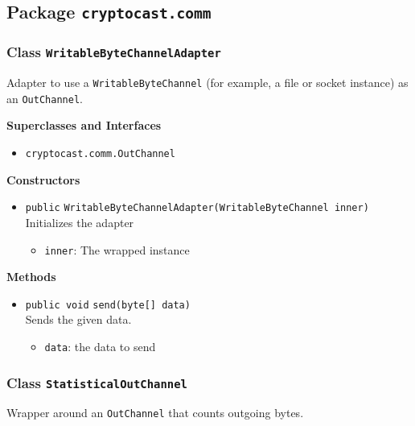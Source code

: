 \subsection{Package \lstinline!cryptocast.comm!}

\subsubsection{Class \lstinline|WritableByteChannelAdapter|}
Adapter to use a \lstinline|WritableByteChannel| (for example, a file or socket instance) as
 an \lstinline|OutChannel|. \\



\textbf{Superclasses and Interfaces}
\begin{itemize}
\item \lstinline|cryptocast.comm.OutChannel|
\end{itemize}



\textbf{Constructors}
\begin{itemize}
\item \lstinline|public| \lstinline|WritableByteChannelAdapter|\lstinline|(WritableByteChannel inner)|\\
Initializes the adapter
\begin{itemize}
\item \lstinline|inner|: The wrapped instance
\end{itemize}



\end{itemize}


\textbf{Methods}
\begin{itemize}
\item \lstinline|public void| \lstinline|send|\lstinline|(byte[] data)|\\
Sends the given data.
\begin{itemize}
\item \lstinline|data|: the data to send
\end{itemize}



\end{itemize}

\subsubsection{Class \lstinline|StatisticalOutChannel|}
Wrapper around an \lstinline|OutChannel| that counts outgoing bytes. \\



